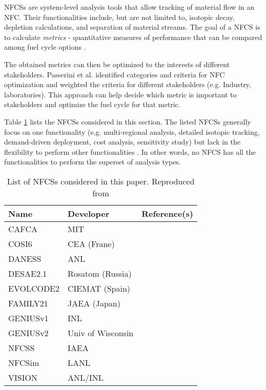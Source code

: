 \glspl{NFCS} are system-level analysis tools
that allow tracking of material flow in an \gls{NFC}. Their
functionalities include, but are not limited to, isotopic decay,
depletion calculations, and separation of material streams.
The goal of a \gls{NFCS} is to calculate \textit{metrics} - quantitative
measures of performance that can be compared among fuel cycle
options \cite{huff_fundamental_2016}.

The obtained metrics can then be optimized to the interests
of different stakeholders. Passerini et al. \cite{passerini_systematic_2014}
identified categories and criteria for \gls{NFC} optimization and
weighted the criteria for different stakeholders (e.g. Industry, laboratories).
This approach can help decide which metric is important to stakeholders
and optimize the fuel cycle for that metric.

Table \ref{tab:fcs} lists the \glspl{NFCS}
considered in this section. The listed \glspl{NFCS}
generally focus on one functionality
(e.g. multi-regional analysis, detailed isotopic tracking,
demand-driven deployment, cost analysis, sensitivity study)
but lack in the flexibility to perform other
functionalities \cite{huff_next_2010}. In
other words, no \gls{NFCS} has all the functionalities to
perform the superset of analysis types.

\begin{table}[h]
    \centering
    \caption{List of \glspl{NFCS} considered in this paper.
             Reproduced from \cite{huff_next_2010}}
    \label{tab:fcs}
    \begin{tabular}{lll}
        \hline
        Name & Developer & Reference(s) \\
        \hline
        CAFCA & MIT & \cite{guerin_benchmark_2009}\\
        COSI6 & CEA (Frane) & \cite{meyer_new_2009} \\
        DANESS & ANL & \cite{van_den_durpel_daness:_2006}\\
        DESAE2.1 & Rosatom (Russia) & \cite{tsibulskiy_desae_2006}\\
        EVOLCODE2 & CIEMAT (Spain) & \cite{alvarez-velarde_validation_2014}\\
        FAMILY21 & JAEA (Japan) & \cite{oecd_nuclear_2009}\\
        GENIUSv1 & INL & \cite{dunzik-gougar_global_2007}\\
        GENIUSv2 & Univ of Wisconsin & \cite{dunn_genius_2009}\\
        NFCSS & IAEA & \cite{iaea_guidance_2008}\\
        NFCSim & LANL & \cite{schneider_nfcsim:_2005} \\
        VISION & ANL/INL & \cite{jacobson_verifiable_2010} \\
        \hline
    \end{tabular}
\end{table}


